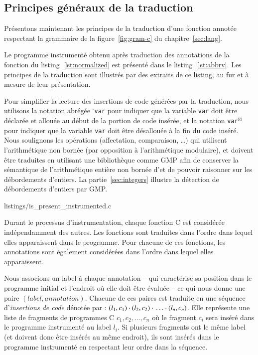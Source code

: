 \subsection{Principes généraux de la traduction}
\label{sec:principles}


Présentons maintenant les principes de la traduction d'une fonction annotée
respectant la grammaire de la figure~\ref{fig:gram-c} du
chapitre~\ref{sec:lang}.

Le programme instrumenté obtenu après traduction des annotations de la fonction
du listing~\ref{lst:normalized} est présenté dans le listing~\ref{lst:abbrv}.
Les principes de la traduction sont illustrés par des extraits de ce listing,
au fur et à mesure de leur présentation.

Pour simplifier la lecture des insertions de code générées par la traduction,
nous utilisons la notation abrégée ${}^{\square}$\lstinline'var' pour indiquer
que la variable \lstinline'var' doit être déclarée et allouée
au début de la portion de code insérée, et la notation
\lstinline'var'${}^{\boxtimes}$ pour indiquer que la variable \lstinline'var' doit
être désallouée à la fin du code inséré.
Nous soulignons les opérations (affectation, comparaison, \dots) qui utilisent
l'arithmétique non bornée (par opposition à l'arithmétique modulaire), et
doivent être traduites en utilisant une bibliothèque comme GMP afin de conserver
la sémantique de l'arithmétique entière non bornée d'\eacsl et de pouvoir
raisonner sur les débordements d'entiers.
La partie~\ref{sec:integers} illustre la détection de débordements d'entiers par
GMP.



                {listings/is_present_instrumented.c}


Durant le processus d'instrumentation, chaque fonction C est considérée
indépendamment des autres.
Les fonctions sont traduites dans l'ordre dans lequel elles apparaissent dans le
programme.
Pour chacune de ces fonctions, les annotations \eacsl sont également considérées
dans l'ordre dans lequel elles apparaissent.

Nous associons un label à chaque annotation -- qui caractérise sa position dans
le programme initial et l'endroit où elle doit être évaluée -- ce qui nous
donne une paire $(label, annotation)$.
Chacune de ces paires est traduite en une séquence
d'\emph{insertions de code} dénotée par :
$(l_1, c_1) \cdot{} (l_2, c_2) \cdot{} \ldots \cdot{} (l_n, c_n)$.
Elle représente une liste de fragments de programmes C $c_1, c_2, \ldots, c_n$
où le fragment $c_i$ sera inséré dans le programme instrumenté au label $l_i$.
Si plusieurs fragments ont le même label (et doivent donc être insérés au
même endroit), ils sont insérés dans le programme instrumenté en respectant leur
ordre dans la séquence.

